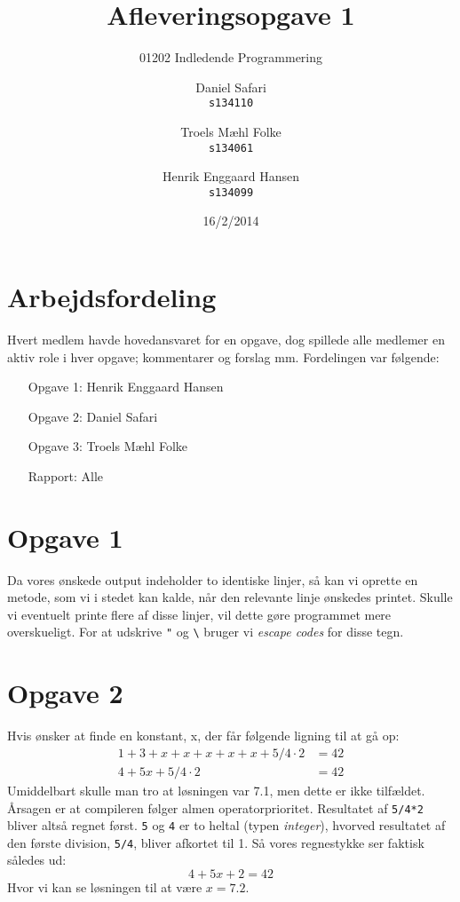 \documentclass{scrartcl}
\newcommand\code[1]{\texttt{#1}}
\begin{document}

\title{Afleveringsopgave 1}
\subtitle{01202 Indledende Programmering}
\author{
  Daniel Safari\\
  \texttt{s134110}
  \and
  Troels Mæhl Folke\\
  \texttt{s134061}
   \and
  Henrik Enggaard Hansen\\
  \texttt{s134099}
}
\date{16/2/2014}
\maketitle
\thispagestyle{empty}
\setcounter{page}{0}
\null
\vfill
\section*{Arbejdsfordeling}
Hvert medlem havde hovedansvaret for en opgave, dog spillede alle medlemer en aktiv role i hver opgave; kommentarer og forslag mm. Fordelingen var følgende:
\begin{itemize}
\setlength{\itemindent}{3em}
\item[Opgave 1:] Henrik Enggaard Hansen
\item[Opgave 2:] Daniel Safari
\item[Opgave 3:] Troels Mæhl Folke
\item[Rapport:]  Alle
\end{itemize}
\newpage
\section*{Opgave 1}
Da vores ønskede output indeholder to identiske linjer, så kan vi oprette en metode, som vi i stedet kan kalde, når den relevante linje ønskedes printet. Skulle vi eventuelt printe flere af disse linjer, vil dette gøre programmet mere overskueligt. For at udskrive \code{"} og \code{\textbackslash} bruger vi \emph{escape codes} for disse tegn.

\section*{Opgave 2}
Hvis ønsker at finde en konstant, x, der får følgende ligning til at gå op: 
\begin{align*}
1+3+x+x+x+x+x+5/4 \cdot 2 & = 42 \\
         4+5x+5/4 \cdot 2 & = 42
\end{align*}
Umiddelbart skulle man tro at løsningen var 7.1, men dette er ikke tilfældet. Årsagen er at compileren følger almen operatorprioritet. Resultatet af \code{5/4*2} bliver altså regnet først. \code{5} og \code{4} er to heltal (typen \emph{integer}), hvorved resultatet af den første division, \code{5/4}, bliver afkortet til 1. Så vores regnestykke ser faktisk således ud:
$$ 4+5x+2 = 42 $$
Hvor vi kan se løsningen til at være $x=7.2$.
\end{document}
